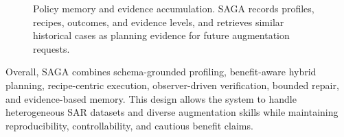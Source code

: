 \begin{figure}[t]
    \centering
    \caption{Policy memory and evidence accumulation. SAGA records profiles, recipes, outcomes, and evidence levels, and retrieves similar historical cases as planning evidence for future augmentation requests.}
    \label{fig:policy_memory}
\end{figure}

Overall, SAGA combines schema-grounded profiling, benefit-aware hybrid planning, recipe-centric execution, observer-driven verification, bounded repair, and evidence-based memory.
This design allows the system to handle heterogeneous SAR datasets and diverse augmentation skills while maintaining reproducibility, controllability, and cautious benefit claims.
